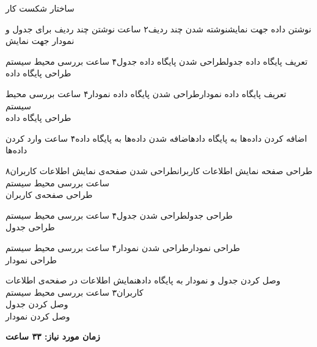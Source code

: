 \begin{wbsbox}{ساختار شکست کار}
\begin{wbssub}{نوشتن داده جهت نمایش}{نوشته شدن چند ردیف}{۲ ساعت}
\task نوشتن چند ردیف برای جدول و نمودار جهت نمایش
\end{wbssub}

\begin{wbssub}{تعریف پایگاه داده جدول}{طراحی شدن پایگاه داده جدول}{۴ ساعت}
\task بررسی محیط سیستم  \\
\task طراحی پایگاه داده
\end{wbssub}

\begin{wbssub}{تعریف پایگاه داده نمودار}{طراحی شدن پایگاه داده نمودار}{۴ ساعت}
\task بررسی محیط سیستم  \\
\task طراحی پایگاه داده
\end{wbssub}

\begin{wbssub}{اضافه کردن داده‌ها به پایگاه داده}{اضافه شدن داده‌ها به پایگاه داده}{۴ ساعت}
\task وارد کردن داده‌ها
\end{wbssub}

\begin{wbssub}{طراحی صفحه نمایش اطلاعات کاربران}{طراحی شدن صفحه‌ی نمایش اطلاعات کاربران}{۸ ساعت}
\task بررسی محیط سیستم  \\
\task طراحی صفحه‌ی کاربران
\end{wbssub}

\begin{wbssub}{طراحی جدول}{طراحی شدن جدول}{۴ ساعت}
\task بررسی محیط سیستم  \\
\task طراحی جدول
\end{wbssub}

\begin{wbssub}{طراحی نمودار}{طراحی شدن نمودار}{۴ ساعت}
\task بررسی محیط سیستم  \\
\task طراحی نمودار
\end{wbssub}

\begin{wbssub}{وصل کردن جدول و نمودار به پایگاه داده}{نمایش اطلاعات در صفحه‌ی اطلاعات کاربران}{۳ ساعت}
\task بررسی محیط سیستم  \\
\task وصل کردن جدول \\
\task وصل کردن نمودار
\end{wbssub}
\begin{center}
\textbf{زمان مورد نیاز: ۳۳ ساعت}
\end{center}


\end{wbsbox}
